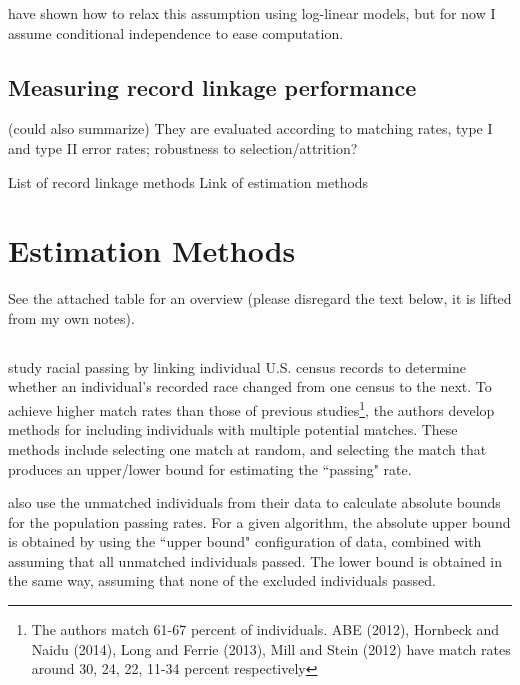 \documentclass[12pt]{article}
\begin{document}
\cite{larsen_rubin_2001} have shown how to relax this assumption using log-linear models, but for now I assume conditional independence to ease computation. 


\subsection{Measuring record linkage performance}

(could also summarize)
They are evaluated according to matching rates, type I and type II error rates; robustness to selection/attrition? 


List of record linkage methods
Link of estimation methods

\section{Estimation Methods} 

See the attached table for an overview (please disregard the text below, it is lifted from my own notes). 

\subsection{\cite{ahl2019}}
\subsection{\cite{nq2015}}
\cite{nq2015} study racial passing by linking individual U.S. census records to determine whether an individual's recorded race changed from one census to the next.  To achieve higher match rates than those of previous studies\footnote{The authors match 61-67 percent of individuals.   ABE (2012), Hornbeck and Naidu (2014), Long and Ferrie (2013), Mill and Stein (2012)
have match rates around 30, 24, 22, 11-34 percent respectively}, the authors develop methods for including individuals with multiple potential matches.  These methods include selecting one match at random, and selecting the match that produces an upper/lower bound for estimating the ``passing" rate.  

\cite{nq2015} also use the unmatched individuals from their data to calculate absolute bounds for the population passing rates.  For a given algorithm, the absolute upper bound is obtained by using the ``upper bound" configuration of data, combined with assuming that all unmatched individuals passed.  The lower bound is obtained in the same way, assuming that none of the excluded individuals passed. 
\end{document}
